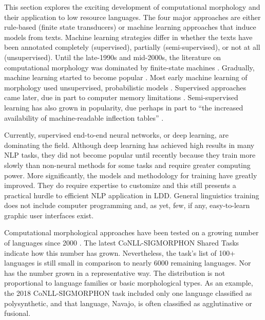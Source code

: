 \documentclass[12pt]{article}
\begin{document}
This section explores the exciting development of computational morphology and their application to low resource languages. The four major approaches are either  rule-based (finite state transducers) or machine learning approaches that induce models from texts. Machine learning strategies differ in whether the texts have been annotated completely (supervised), partially (semi-supervised), or not at all (unsupervised). Until the late-1990s and mid-2000s, the literature on computational morphology was dominated by finite-state machines \cite{kaplan_phonological_1981,koskenniemi_two-level_1983,beesley_finite-state_2003}. Gradually, machine learning started to become popular \cite{cohen_joint_2007,ruokolainen_comparative_2016}. Most early machine learning of morphology used unsupervised, probabilistic models \cite{roark_computational_2007}. Supervised approaches came later, due in part to computer memory limitations \cite{hammarstrom_unsupervised_2011}. Semi-supervised learning has also grown in popularity, due perhaps in part to ``the increased availability of machine-readable inflection tables'' \cite[page 18]{goldsmith_computational_2017}. 

Currently, supervised end-to-end neural networks, or deep learning, are dominating the field. Although deep learning has achieved high results in many NLP tasks, they did not become popular until recently because they train more slowly than non-neural methods for some tasks \cite{cotterell_cross-lingual_2017} and require greater computing power. More significantly, the models and methodology for training have greatly improved. They do require expertise to customize and this still presents a practical hurdle to efficient NLP application in LDD. General linguistics training does not include computer programming and, as yet, few, if any, easy-to-learn graphic user interfaces exist. 

Computational morphological approaches have been tested on a growing number of languages since 2000 \cite{hammarstrom_unsupervised_2011}. The latest CoNLL-SIGMORPHON Shared Tasks \cite{cotterell_cross-lingual_2017,cotterell_conllsigmorphon_2018} indicate how this number has grown. Nevertheless, the task's list of 100+ languages is still small in comparison to nearly 6000 remaining languages. Nor has the number grown in a representative way. The distribution is not proportional to language families or basic morphological types. As an example, the 2018 CoNLL-SIGMORPHON task included only one language classified as polysynthetic, and that language, Navajo, is often classified as agglutinative or fusional.
\end{document}
